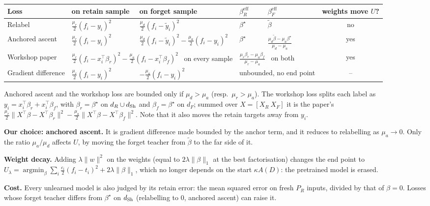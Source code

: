 \documentclass[10pt]{article}
\begin{document}
\begin{center}\small\setlength{\tabcolsep}{5pt}\renewcommand{\arraystretch}{1.6}
\begin{tabular}{@{}lllllc@{}}
\toprule
Loss & on retain sample & on forget sample & $\beta^{\mathrm{eff}}_R$ & $\beta^{\mathrm{eff}}_F$ & weights move $U$?\\
\midrule
Relabel & $\frac{\mu_r}{2}(f_i-y_i)^2$ & $\frac{\mu_d}{2}(f_i-\tilde y_i)^2$ & $\beta^\star$ & $\tilde\beta$ & no\\
Anchored ascent & $\frac{\mu_r}{2}(f_i-y_i)^2$ & $\frac{\mu_d}{2}(f_i-\tilde y_i)^2-\frac{\mu_a}{2}(f_i-y_i)^2$ & $\beta^\star$ & $\frac{\mu_d\tilde\beta-\mu_a\beta^\star}{\mu_d-\mu_a}$ & yes\\
Workshop paper & \multicolumn{2}{l}{$\frac{\mu_r}{2}(f_i-x_i^\top\beta_r)^2-\frac{\mu_a}{2}(f_i-x_i^\top\beta_f)^2$ \ on every sample} & \multicolumn{2}{l}{$\frac{\mu_r\beta_r-\mu_a\beta_f}{\mu_r-\mu_a}$ \ on both} & yes\\
Gradient difference & $\frac{\mu_r}{2}(f_i-y_i)^2$ & $-\frac{\mu_a}{2}(f_i-y_i)^2$ & \multicolumn{2}{l}{unbounded, no end point} & --\\
\bottomrule
\end{tabular}
\end{center}

\vspace{-2pt}
Anchored ascent and the workshop loss are bounded only if $\mu_d>\mu_a$ (resp.\ $\mu_r>\mu_a$). The workshop loss splits each label as $y_i=x_i^\top\beta_r+x_i^\top\beta_f$, with $\beta_r=\beta^\star$ on $d_R\cup d_{\mathrm{Sh}}$ and $\beta_f=\beta^\star$ on $d_F$; summed over $X=[X_R\ X_F]$ it is the paper's $\frac{\mu_r}{2}\|X^\top\beta-X^\top\beta_r\|^2-\frac{\mu_a}{2}\|X^\top\beta-X^\top\beta_f\|^2$. Note that it also moves the retain targets away from $y_i$.

\textbf{Our choice: anchored ascent.} It is gradient difference made bounded by the anchor term, and it reduces to relabelling as $\mu_a\to0$. Only the ratio $\mu_a/\mu_d$ affects $U$, by moving the forget teacher from $\tilde\beta$ to the far side of it.

\textbf{Weight decay.} Adding $\lambda\|w\|^2$ on the weights (equal to $2\lambda\|\beta\|_1$ at the best factorisation) changes the end point to
$U_\lambda=\operatorname*{argmin}_\beta \sum_i\frac{c_i}{2}(f_i-t_i)^2+2\lambda\|\beta\|_1$, which no longer depends on the start $\kappa A(D)$: the pretrained model is erased.

\textbf{Cost.} Every unlearned model is also judged by its retain error: the mean squared error on fresh $P_R$ inputs, divided by that of $\beta=0$. Losses whose forget teacher differs from $\beta^\star$ on $d_{\mathrm{Sh}}$ (relabelling to $0$, anchored ascent) can raise it.
\end{document}
